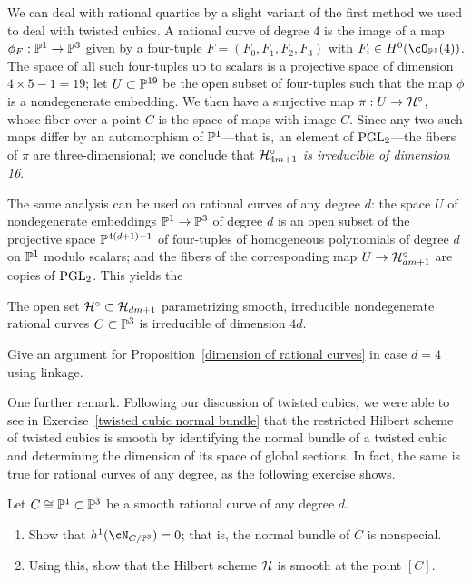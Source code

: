 We can deal with rational quartics by a slight variant of the first method we used to deal with twisted cubics. A rational curve of degree 4 is the image of a map $\phi_F : \PP^1 \to \PP^3$ given by a four-tuple $F = (F_0,F_1,F_2,F_3)$ with $F_i \in H^0(\cO_{\PP^1}(4))$. The space of all such four-tuples up to scalars is a projective space of dimension $4 \times 5 - 1 = 19$; let $U \subset \PP^{19}$ be the open subset of four-tuples such that the map $\phi$ is a nondegenerate embedding. We then have a surjective map $\pi : U \to \cH^\circ$, whose fiber over a point $C$ is the space of maps with image $C$. Since any two such maps differ by an automorphism of $\PP^1$---that is, an element of $\PGL_2$---the fibers of $\pi$ are three-dimensional; we conclude that \emph{$\cH^\circ_{4m+1}$ is irreducible of dimension 16}.

The same analysis can be used on rational curves of any degree $d$: the space $U$ of nondegenerate embeddings $\PP^1 \to \PP^3$ of degree $d$ is an open subset of the projective space $\PP^{4(d+1)-1}$ of four-tuples of homogeneous polynomials of degree $d$ on $\PP^1$ modulo scalars; and the fibers of the corresponding map $U \to \cH^\circ_{dm+1}$ are copies of $\PGL_2$. This yields the

\begin{proposition}\label{dimension of rational curves}
The open set $\cH^\circ \subset \cH_{dm+1}$ parametrizing smooth, irreducible nondegenerate rational curves $C \subset \PP^3$ is irreducible of dimension $4d$.
\end{proposition}

\begin{exercise}
Give an argument for Proposition~\ref{dimension of rational curves} in case $d=4$ using linkage. 
\end{exercise}

One further remark. Following our discussion of twisted cubics, we were able to see in Exercise~\ref{twisted cubic normal bundle} that the restricted Hilbert scheme of twisted cubics is smooth by identifying the normal bundle of a twisted cubic and determining the dimension of its space of global sections. In fact, the same is true for rational curves of any degree, as the following exercise shows.

\begin{exercise}
Let $C \cong \PP^1 \subset \PP^3$ be a smooth rational curve of any degree $d$. 
\begin{enumerate}
\item Show that $h^1(\cN_{C/\PP^3}) = 0$; that is, the normal bundle of $C$ is nonspecial.
\item Using this, show that the Hilbert scheme $\cH$ is smooth at the point $[C]$.
\end{enumerate} 
\end{exercise}

